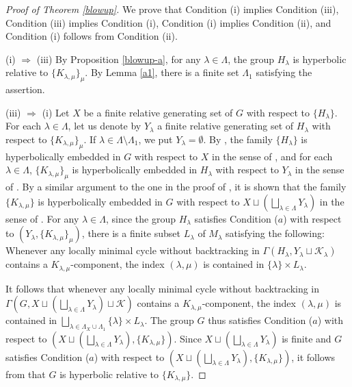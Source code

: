\documentclass{amsart}
\theoremstyle{definition}
\begin{document}
\begin{proof}[Proof of Theorem \ref{blowup}]
We prove that Condition (i) implies Condition (iii), Condition (iii) implies Condition (i), Condition (i) implies Condition (ii), and Condition (i) follows from Condition (ii). 

(i) $\Rightarrow$ (iii)
By Proposition \ref{blowup-a}, for any $\lambda\in \Lambda$, the group $H_\lambda$ is hyperbolic relative to $\{K_{\lambda,\mu}\}_\mu$. 
By Lemma \ref{a1}, there is a finite set $\Lambda_1$ satisfying the assertion. 

(iii) $\Rightarrow$ (i)
Let $X$ be a finite relative generating set of $G$ with respect to $\{H_\lambda\}$. 
For each $\lambda\in\Lambda$, let us denote by $Y_\lambda$ a finite relative generating set of $H_\lambda$ with respect to $\{K_{\lambda,\mu}\}_\mu$. 
If $\lambda\in \Lambda \setminus \Lambda_1$, we put $Y_\lambda=\emptyset$. 
By \cite[Proposition 4.28 (a)]{D-G-O12}, the family $\{H_\lambda\}$ is hyperbolically embedded in $G$ with respect to $X$ in the sense of \cite[Definition 4.25]{D-G-O12}, and for each $\lambda\in\Lambda$, $\{K_{\lambda,\mu}\}_\mu$ is hyperbolically embedded in $H_\lambda$ with respect to $Y_\lambda$ in the sense of \cite[Definition 4.25]{D-G-O12}. 
By a similar argument to the one in the proof of \cite[Proposition 4.35]{D-G-O12}, it is shown that the family $\{K_{\lambda,\mu}\}$ is hyperbolically embedded in $G$ with respect to $X\sqcup \left(\bigsqcup_{\lambda\in\Lambda}Y_\lambda\right)$ in the sense of \cite[Definition 4.25]{D-G-O12}. 
For any $\lambda \in \Lambda$, since the group $H_\lambda$ satisfies Condition ($a$) with respect to $(Y_\lambda, \{K_{\lambda,\mu}\}_\mu)$, there is a finite subset $L_\lambda$ of $M_\lambda$ satisfying the following: 
Whenever any locally minimal cycle without backtracking in $\Gamma(H_\lambda,Y_\lambda \sqcup {\mathcal K}_\lambda)$ contains a $K_{\lambda,\mu}$-component, the index $(\lambda,\mu)$ is contained in $\{\lambda\} \times L_\lambda$.

It follows that whenever any locally minimal cycle without backtracking in $\Gamma(G, X \sqcup (\bigsqcup_{\lambda \in \Lambda} Y_\lambda) \sqcup {\mathcal K})$ contains a $K_{\lambda,\mu}$-component, the index $(\lambda,\mu)$ is contained in $\bigsqcup_{\lambda \in \Lambda_X \cup \Lambda_1} \{\lambda\} \times L_\lambda$.
The group $G$ thus satisfies Condition ($a$) with respect to $(X \sqcup (\bigsqcup_{\lambda \in \Lambda} Y_\lambda), \{K_{\lambda,\mu}\})$. 
Since $X\sqcup \left(\bigsqcup_{\lambda\in\Lambda}Y_\lambda\right)$ is finite and $G$ satisfies Condition ($a$) with respect to $(X\sqcup \left(\bigsqcup_{\lambda\in\Lambda}Y_\lambda\right),\{K_{\lambda,\mu}\})$, it follows from \cite[Theorem 3.1 (iv) and (ii)]{M-O-Y1} that $G$ is hyperbolic relative to $\{K_{\lambda,\mu}\}$. 


\end{proof}
\end{document}
